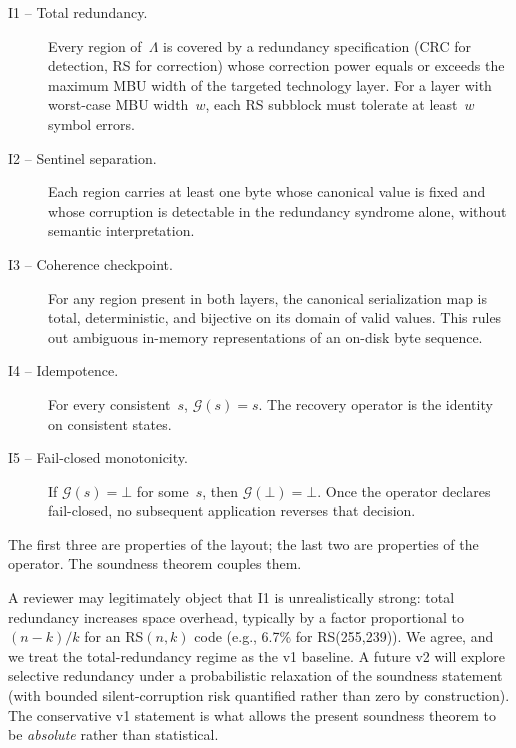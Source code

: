 \begin{description}
\item[I1 -- Total redundancy.] Every region of~\(\Lambda\) is covered
  by a redundancy specification (CRC for detection, RS for correction)
  whose correction power equals or exceeds the maximum MBU width of
  the targeted technology layer. For a layer with worst-case MBU
  width~\(w\), each RS subblock must tolerate at least~\(w\) symbol
  errors.
\item[I2 -- Sentinel separation.] Each region carries at least one
  byte whose canonical value is fixed and whose corruption is
  detectable in the redundancy syndrome alone, without semantic
  interpretation.
\item[I3 -- Coherence checkpoint.] For any region present in both
  layers, the canonical serialization map is total, deterministic,
  and bijective on its domain of valid values. This rules out
  ambiguous in-memory representations of an on-disk byte sequence.
\item[I4 -- Idempotence.] For every consistent~\(s\),
  \(\mathcal{G}(s) = s\). The recovery operator is the identity on
  consistent states.
\item[I5 -- Fail-closed monotonicity.] If
  \(\mathcal{G}(s) = \bot\) for some~\(s\), then
  \(\mathcal{G}(\bot) = \bot\). Once the operator declares
  fail-closed, no subsequent application reverses that decision.
\end{description}

The first three are properties of the layout; the last two are
properties of the operator. The soundness theorem couples them.

\begin{remark}
A reviewer may legitimately object that I1 is unrealistically
strong: total redundancy increases space overhead, typically by a
factor proportional to~\((n-k)/k\) for an RS\((n, k)\) code (e.g.,
6.7\% for RS(255,239)). We agree, and we treat the total-redundancy
regime as the v1 baseline. A future v2 will explore selective
redundancy under a probabilistic relaxation of the soundness
statement (with bounded silent-corruption risk quantified rather
than zero by construction). The conservative v1 statement is what
allows the present soundness theorem to be \emph{absolute} rather
than statistical.
\end{remark}
